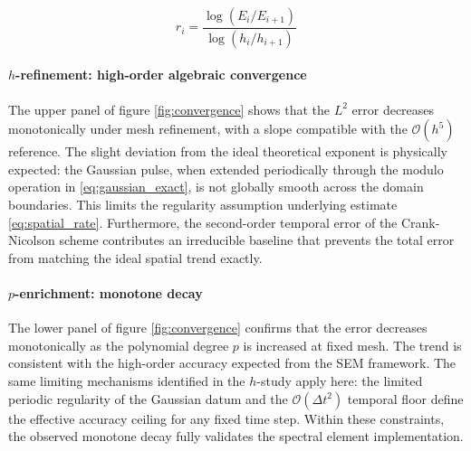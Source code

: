 \begin{equation}
r_i = \frac{\log(E_i / E_{i+1})}{\log(h_i / h_{i+1})}
\label{eq:conv_rate}
\end{equation}

\paragraph{\(h\)-refinement: high-order algebraic convergence}
The upper panel of figure \ref{fig:convergence} shows that the \(L^2\) error decreases monotonically under mesh refinement, with a slope compatible with the \(\mathcal{O}(h^5)\) reference. The slight deviation from the ideal theoretical exponent is physically expected: the Gaussian pulse, when extended periodically through the modulo operation in \eqref{eq:gaussian_exact}, is not globally smooth across the domain boundaries. This limits the regularity assumption underlying estimate \eqref{eq:spatial_rate}. Furthermore, the second-order temporal error of the Crank-Nicolson scheme contributes an irreducible baseline that prevents the total error from matching the ideal spatial trend exactly.

\paragraph{\(p\)-enrichment: monotone decay}
The lower panel of figure \ref{fig:convergence} confirms that the error decreases monotonically as the polynomial degree \(p\) is increased at fixed mesh. The trend is consistent with the high-order accuracy expected from the SEM framework. The same limiting mechanisms identified in the \(h\)-study apply here: the limited periodic regularity of the Gaussian datum and the \(\mathcal{O}(\Delta t^2)\) temporal floor define the effective accuracy ceiling for any fixed time step. Within these constraints, the observed monotone decay fully validates the spectral element implementation.

